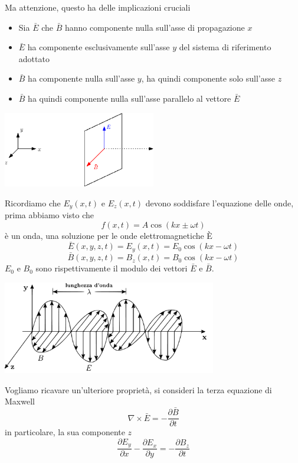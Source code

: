 \documentclass[10pt, letterpaper]{report}
\begin{document}
Ma attenzione, questo ha delle implicazioni cruciali\begin{itemize}
    \item Sia $\bar E$ che $\bar B$ hanno componente nulla sull'asse di propagazione $x$
    \item $\bar E$ ha componente esclusivamente sull'asse $y$ del sistema di riferimento adottato 
    \item $\bar B$ ha componente nulla sull'asse $y$, ha quindi componente solo sull'asse $z$
    \item $\bar B$ ha quindi componente nulla sull'asse parallelo al vettore $\bar E$
\end{itemize}
\begin{center}
    \includegraphics[width=0.5\textwidth]{images/EM1}
\end{center}
Ricordiamo che $E_y(x,t)$ e $E_z(x,t)$ devono soddisfare l'equazione delle onde, prima abbiamo visto che $$ f(x,t)=
A\cos(kx\pm\omega t)
$$
è un onda, una soluzione per le onde elettromagnetiche È 
$$ 
\bar E(x,y,z,t) = E_y(x,t)=E_0\cos(kx-\omega t)
$$
$$ 
\bar B(x,y,z,t) = B_z(x,t)=B_0\cos(kx-\omega t)
$$
$E_0$ e $B_0$ sono rispettivamente il modulo dei vettori $\bar E$ e $\bar B$.\begin{center}
    \includegraphics[width=0.7\textwidth]{images/EM.pdf}
\end{center}
Vogliamo ricavare un'ulteriore proprietà, si consideri la terza equazione di Maxwell$$\nabla \times \bar E = -\dfrac{\partial \bar B }{\partial t}$$ in particolare, la sua componente $z$
$$\frac{\partial E_y}{\partial x}-\frac{\partial E_x}{\partial y}=-\frac{\partial B_z}{\partial t}$$
\end{document}
